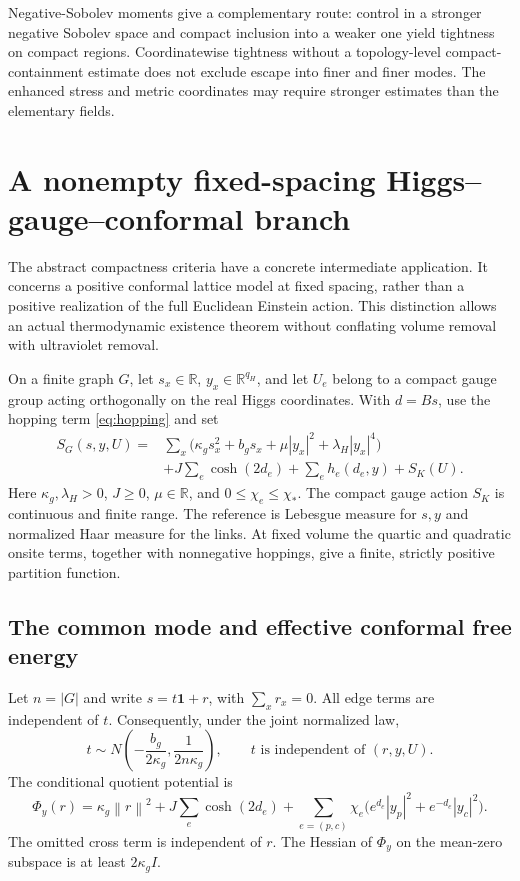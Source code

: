 \documentclass[11pt,a4paper,oneside]{book}
\theoremstyle{plain}
\theoremstyle{definition}
\theoremstyle{remark}
\newcommand{\R}{\mathbb R}
\newcommand{\one}{\mathbf 1}
\newcommand{\norm}[1]{\left\lVert#1\right\rVert}
\newcommand{\src}[2]{\cite{#1}}
\begin{document}
Negative-Sobolev moments give a complementary route: control in a stronger negative Sobolev space and compact inclusion into a weaker one yield tightness on compact regions. Coordinatewise tightness without a topology-level compact-containment estimate does not exclude escape into finer and finer modes. The enhanced stress and metric coordinates may require stronger estimates than the elementary fields. \src{R16}{thm:v16v88-tightness}

\section{A nonempty fixed-spacing Higgs--gauge--conformal branch}
\label{sec:fixed-spacing-gibbs}
The abstract compactness criteria have a concrete intermediate application.
It concerns a positive conformal lattice model at fixed spacing, rather
than a positive realization of the full Euclidean Einstein action.  This
distinction allows an actual thermodynamic existence theorem without
conflating volume removal with ultraviolet removal.

On a finite graph $G$, let $s_x\in\R$, $y_x\in\R^{q_H}$, and let $U_e$
belong to a compact gauge group acting orthogonally on the real Higgs
coordinates.  With $d=Bs$, use the hopping term \eqref{eq:hopping} and set
\begin{equation}
\begin{split}
 S_G(s,y,U)={}&\sum_x
 \bigl(\kappa_gs_x^2+b_gs_x+\mu|y_x|^2+\lambda_H|y_x|^4\bigr)\\
 &+J\sum_e\cosh(2d_e)+\sum_eh_e(d_e,y)+S_K(U).
\end{split}
\label{eq:fixed-spacing-action}
\end{equation}
Here $\kappa_g,\lambda_H>0$, $J\ge0$, $\mu\in\R$, and
$0\le\chi_e\le\chi_*$.  The compact gauge action $S_K$ is continuous and
finite range.  The reference is Lebesgue measure for $s,y$ and normalized
Haar measure for the links.  At fixed volume the quartic and quadratic
onsite terms, together with nonnegative hoppings, give a finite, strictly
positive partition function.

\subsection{The common mode and effective conformal free energy}
Let $n=|G|$ and write $s=t\one+r$, with $\sum_xr_x=0$.  All edge terms
are independent of $t$.  Consequently, under the joint normalized law,
\begin{equation}
 t\sim N\!\left(-\frac{b_g}{2\kappa_g},\frac1{2n\kappa_g}\right),
 \qquad t\text{ is independent of }(r,y,U).
 \label{eq:common-conformal-mode}
\end{equation}
The conditional quotient potential is
\begin{equation}
 \Phi_y(r)=\kappa_g\norm r^2+J\sum_e\cosh(2d_e)
 +\sum_{e=(p,c)}\chi_e
       \bigl(e^{d_e}|y_p|^2+e^{-d_e}|y_c|^2\bigr).
 \label{eq:conditional-conformal-potential}
\end{equation}
The omitted cross term is independent of $r$.  The Hessian of
$\Phi_y$ on the mean-zero subspace is at least $2\kappa_gI$.
\src{R17}{thm:v17v32-factor,thm:v17v32-hessian}
\end{document}
